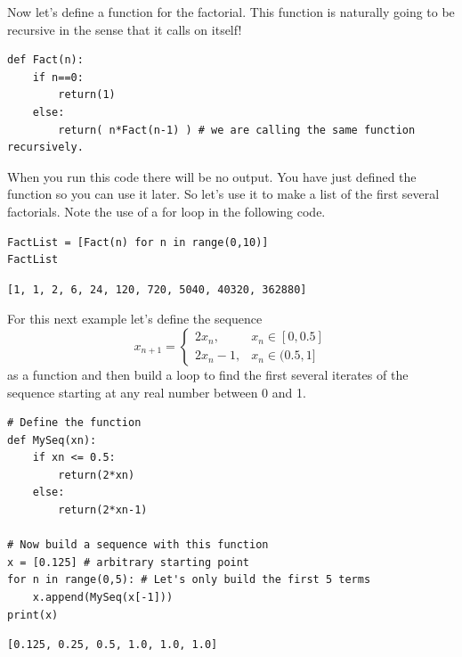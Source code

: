 \begin{example}
    Now let's define a function for the factorial. This function is naturally going to be
    recursive in the sense that it calls on itself!

    \bcode
\begin{lstlisting}
def Fact(n):
    if n==0:
        return(1)
    else:
        return( n*Fact(n-1) ) # we are calling the same function recursively.
\end{lstlisting}
When you run this code there will be no output.  You have just defined the function so you
can use it later.  So let's use it to make a list of the first several factorials.  Note
the use of a for loop in the following code.

\bcode
\begin{lstlisting}
FactList = [Fact(n) for n in range(0,10)]
FactList
\end{lstlisting}
\boutput
\begin{lstlisting}
[1, 1, 2, 6, 24, 120, 720, 5040, 40320, 362880]
\end{lstlisting}
\end{example}


\begin{example}
    For this next example let's define the sequence 
$$x_{n+1} = \left\{ \begin{array}{ll} 2x_n, & x_n \in [0,0.5] \\ 2x_n - 1, & x_n \in (0.5,1] \end{array} \right.$$ 
as a function and then build a loop to find the first several iterates of the sequence starting at any real number between 0 and 1.

\bcode
\begin{lstlisting}
# Define the function
def MySeq(xn):
    if xn <= 0.5:
        return(2*xn)
    else:
        return(2*xn-1)

# Now build a sequence with this function
x = [0.125] # arbitrary starting point
for n in range(0,5): # Let's only build the first 5 terms
    x.append(MySeq(x[-1]))
print(x)
\end{lstlisting}
\boutput
\begin{lstlisting}
[0.125, 0.25, 0.5, 1.0, 1.0, 1.0]
\end{lstlisting}
\end{example}


